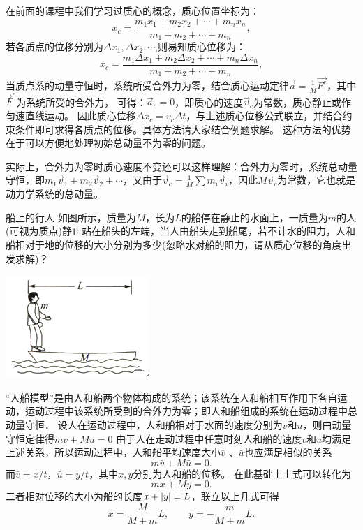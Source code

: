 在前面的课程中我们学习过质心的概念，质心位置坐标为：
\begin{equation}
x_c = \frac{m_1x_1+m_2x_2+\cdots+m_nx_n}{m_1+m_2+\cdots+m_n},
\end{equation}
若各质点的位移分别为$ \Delta x_1,\Delta x_2,\cdots $,则易知质心位移为：
\begin{equation}
x_c = \frac{m_1\Delta x_1+m_2\Delta x_2+\cdots+m_n\Delta x_n}{m_1+m_2+\cdots+m_n},
\end{equation}
当质点系的动量守恒时，系统所受合外力为零，结合质心运动定律$ \vec{a} = \frac{1}{M}\vec{F^{e}} $，其中$ \vec{F}^{e} $为系统所受的合外力，
可得：$\vec{a}_c=0$，即质心的速度$\vec{v}_c$为常数，质心静止或作匀速直线运动。
因此质心位移$ \Delta x_c=v_c \Delta t $，与上述质心位移公式联立，并结合约束条件即可求得各质点的位移。具体方法请大家结合例题求解。
这种方法的优势在于可以方便地处理初始总动量不为零的问题。

实际上，合外力为零时质心速度不变还可以这样理解：合外力为零时，系统总动量守恒，即$ m_1\vec{v}_1+m_2\vec{v}_2 +\cdots$，又由于$\vec{v}_c  = \frac{1}{M}\sum m_i\vec{v}_i$，因此$ M\vec{v}_c $为常数，它也就是动力学系统的总动量。

\begin{app}{船上的行人}{}
	如图所示，质量为$ M $，长为$ L $的船停在静止的水面上，一质量为$ m $的人(可视为质点)静止站在船头的左端，当人由船头走到船尾，若不计水的阻力，人和船相对于地的位移的大小分别为多少(忽略水对船的阻力，请从质心位移的角度出发求解)？
	\begin{center}

\includegraphics[width=0.4\linewidth]{image/momentum-20}
\end{center}

	\tcblower
	
	“人船模型”是由人和船两个物体构成的系统；该系统在人和船相互作用下各自运动，运动过程中该系统所受到的合外力为零；即人和船组成的系统在运动过程中总动量守恒．
	设人在运动过程中，人和船相对于水面的速度分别为$ v $和$ u $，则由动量守恒定律得$ mv+Mu=0 $
	由于人在走动过程中任意时刻人和船的速度$ v $和$ u $均满足上述关系，所以运动过程中，人和船平均速度大小$ \bar{v} $ 、$\bar{u}$也应满足相似的关系
	\[
	m\bar{v}+M\bar{u}=0.
	\]
	而$ \bar{v} = x/t $，$ \bar{u} = y/t $，其中$ x,y $分别为人和船的位移。
	在此基础上上式可以转化为
	\[
	mx+My = 0.
	\]
	二者相对位移的大小为船的长度$ x+\abs{y} = L $，联立以上几式可得
	\[
	x = \frac{M}{M+m}L,\qquad y = -\frac{m}{M+m}L.
	\]

\end{app}

